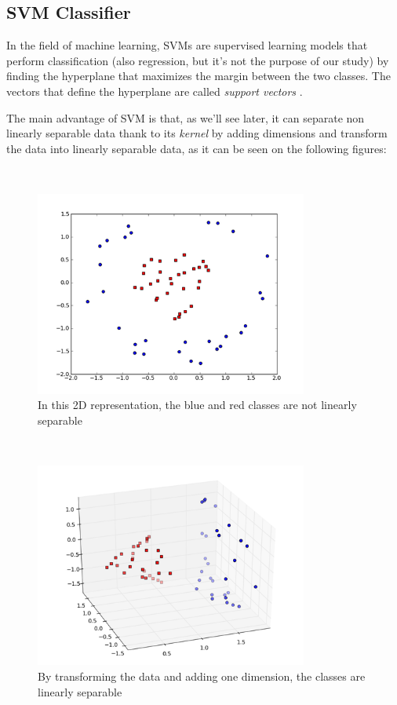\subsection{SVM Classifier}
In the field of machine learning, SVMs are supervised learning models that perform classification (also regression, but it's not the purpose of our study) by finding the hyperplane that maximizes the margin between the two classes. The vectors that define the hyperplane are called \emph{support vectors} \cite{Boser:1992}.

The main advantage of SVM is that, as we'll see later, it can separate non linearly separable data thank to its \emph{kernel} by adding dimensions and transform the data into linearly separable data, as it can be seen on the following figures:

\
\begin{figure}[H]
    \centering
    \includegraphics[width=0.8\textwidth]{fig/svm-nonlin.png}
    \caption[Short caption]{In this 2D representation, the blue and red classes are not linearly separable}
    \label{fig:svm-nonlin}
\end{figure}

\
\begin{figure}[H]
    \centering
    \includegraphics[width=0.8\textwidth]{fig/svm-lin.png}
    \caption[Short caption]{By transforming the data and adding one dimension, the classes are linearly separable}
    \label{fig:svm-lin}
\end{figure}

